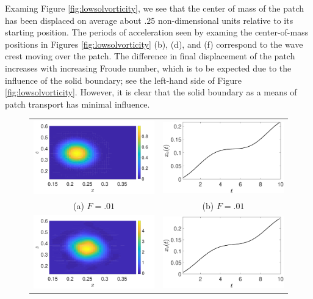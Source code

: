 \documentclass[a4paper,11pt]{article}
\begin{document}
Examing Figure \ref{fig:lowsolvorticity}, we see that the center of mass of the patch has been displaced on average about $.25$ non-dimensional units relative to its starting position.  The periods of acceleration seen by examing the center-of-mass positions in Figures \ref{fig:lowsolvorticity} (b), (d), and (f) correspond to the wave crest moving over the patch.  The difference in final displacement of the patch increases with increasing Froude number, which is to be expected due to the influence of the solid boundary; see the left-hand side of Figure \ref{fig:lowsolvorticity}.  However, it is clear that the solid boundary as a means of patch transport has minimal influence.
\begin{figure}
\centering
\begin{tabular}{cc}
\includegraphics[width=.45\textwidth]{vorticity_wm_1_modu_pt3} &  \includegraphics[width=.45\textwidth]{com_wm_1_modu_pt3}\\
(a) $F=.01$ & (b) $F=.01$\\
\includegraphics[width=.45\textwidth]{vorticity_wm_5_modu_pt3} & \includegraphics[width=.45\textwidth]{com_wm_5_modu_pt3}\\

\end{tabular}
\end{figure}
\end{document}
